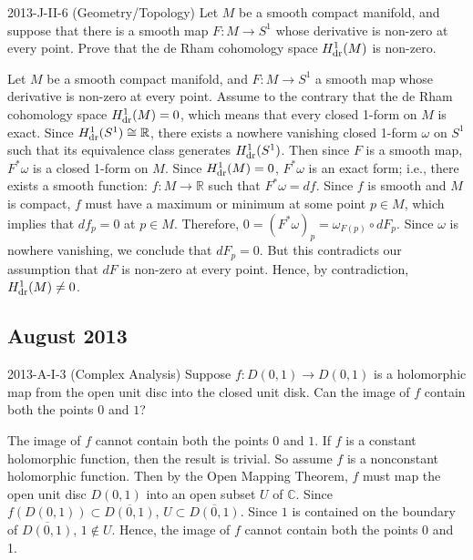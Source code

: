 \documentclass{article}
\begin{document}
\begin{prb}{2013-J-II-6 (Geometry/Topology)}
	Let $M$ be a smooth compact manifold, and suppose that there is a smooth map $F: M \to S^{1}$ whose derivative is non-zero at every point. Prove that the de Rham cohomology space $H^{1}_{\text{dr}}(M)$ is non-zero. 
\end{prb}
\begin{solutions}
	Let $M$ be a smooth compact manifold, and $F: M \to S^{1}$ a smooth map whose derivative is non-zero at every point. Assume to the contrary that the de Rham cohomology space $H^{1}_{\text{dr}}(M) =0$, which means that every closed 1-form on $M$ is exact. Since $H^{1}_{\text{dr}}(S^{1}) \cong \mathbb{R}$, there exists a nowhere vanishing closed 1-form $\omega$ on $S^{1}$ such that its equivalence class generates $H^{1}_{\text{dr}}(S^{1})$. Then since $F$ is a smooth map, $F^{\ast}\omega$ is a closed 1-form on $M$. Since $H^{1}_{\text{dr}}(M) = 0$, $F^{\ast}\omega$ is an exact form; i.e., there exists a smooth function: $f: M \to \mathbb{R}$ such that $F^{\ast}\omega = df$. Since $f$ is smooth and $M$ is compact, $f$ must have a maximum or minimum at some point $p \in M$, which implies that $df_{p} = 0$ at $p \in M$. Therefore, $0 = (F^{\ast}\omega)_{p} = \omega_{F(p)} \circ dF_{p}$. Since $\omega$ is nowhere vanishing, we conclude that $dF_{p} =0$. But this contradicts our assumption that $dF$ is non-zero at every point. Hence, by contradiction, $H^{1}_{\text{dr}}(M) \neq 0$. 
\end{solutions}


\newpage 
\subsection{August 2013}

\begin{prb}{2013-A-I-3 (Complex Analysis)}
	Suppose $f: D(0,1) \to D(0,1)$ is a holomorphic map from the open unit disc into the closed unit disk. Can the image of $f$ contain both the points $0$ and $1$? 
\end{prb}
\begin{solutions}
	The image of $f$ cannot contain both the points $0$ and $1$. If $f$ is a constant holomorphic function, then the result is trivial. So assume $f$ is a nonconstant holomorphic function. Then by the Open Mapping Theorem, $f$ must map the open unit disc $D(0,1)$ into an open subset $U$ of $\mathbb{C}$. Since $f(D(0,1)) \subset \overline{D(0,1)}$, $U \subset \overline{D(0,1)}$. Since $1$ is contained on the boundary of $\overline{D(0,1)}$, $1 \notin U$. Hence, the image of $f$ cannot contain both the points 0 and 1. 
\end{solutions}
\end{document}
